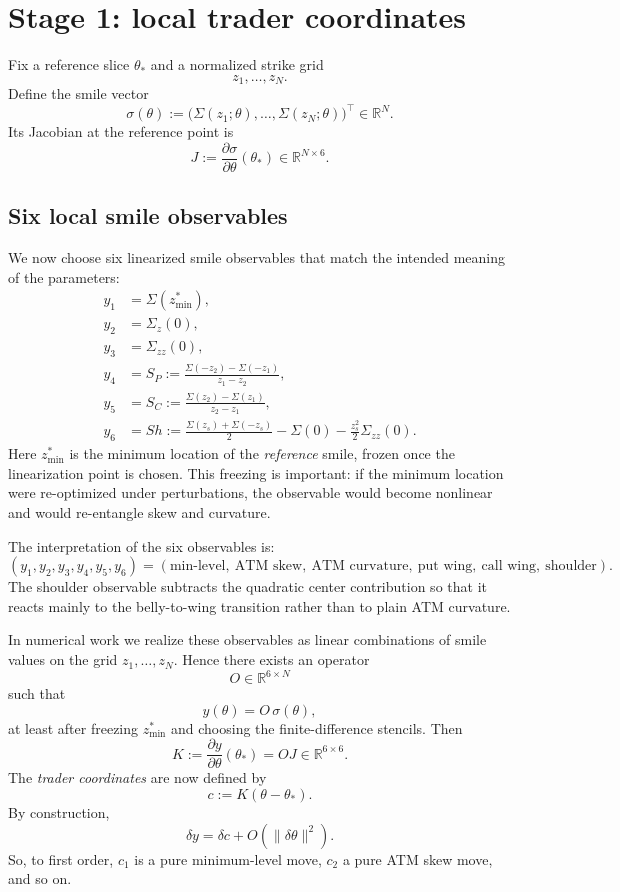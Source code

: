 \documentclass[11pt]{article}
\newcommand{\R}{\mathbb{R}}
\newcommand{\Sig}{\Sigma}
\begin{document}
\section{Stage 1: local trader coordinates}
Fix a reference slice $\theta_*$ and a normalized strike grid
\[
z_1,\dots,z_N.
\]
Define the smile vector
\[
\sigma(\theta)
:= \bigl(\Sig(z_1;\theta),\dots,\Sig(z_N;\theta)\bigr)^\top \in \R^N.
\]
Its Jacobian at the reference point is
\begin{equation}
J := \frac{\partial \sigma}{\partial \theta}(\theta_*) \in \R^{N\times 6}.
\label{eq:J-def}
\end{equation}

\subsection{Six local smile observables}
We now choose six linearized smile observables that match the intended meaning of the parameters:
\begin{align}
y_1 &= \Sig(z_{\min}^*), \\
y_2 &= \Sig_z(0), \\
y_3 &= \Sig_{zz}(0), \\
y_4 &= S_P := \frac{\Sig(-z_2)-\Sig(-z_1)}{z_1-z_2}, \\
y_5 &= S_C := \frac{\Sig(z_2)-\Sig(z_1)}{z_2-z_1}, \\
y_6 &= Sh := \frac{\Sig(z_s)+\Sig(-z_s)}{2} - \Sig(0) - \frac{z_s^2}{2}\Sig_{zz}(0).
\label{eq:observable-defs}
\end{align}
Here $z_{\min}^*$ is the minimum location of the \emph{reference} smile, frozen once the linearization point is chosen. This freezing is important: if the minimum location were re-optimized under perturbations, the observable would become nonlinear and would re-entangle skew and curvature.

The interpretation of the six observables is:
\[
(y_1,y_2,y_3,y_4,y_5,y_6)
=
(\text{min-level},\ \text{ATM skew},\ \text{ATM curvature},\ \text{put wing},\ \text{call wing},\ \text{shoulder}).
\]
The shoulder observable subtracts the quadratic center contribution so that it reacts mainly to the belly-to-wing transition rather than to plain ATM curvature.

In numerical work we realize these observables as linear combinations of smile values on the grid $z_1,\dots,z_N$. Hence there exists an operator
\[
O \in \R^{6\times N}
\]
such that
\[
y(\theta) = O\,\sigma(\theta),
\]
at least after freezing $z_{\min}^*$ and choosing the finite-difference stencils.
Then
\begin{equation}
K := \frac{\partial y}{\partial \theta}(\theta_*) = OJ \in \R^{6\times 6}.
\label{eq:K-def}
\end{equation}
The \emph{trader coordinates} are now defined by
\begin{equation}
c := K(\theta-\theta_*).
\label{eq:trader-coords}
\end{equation}
By construction,
\begin{equation}
\delta y = \delta c + O(\|\delta\theta\|^2).
\label{eq:delta-y-delta-c}
\end{equation}
So, to first order, $c_1$ is a pure minimum-level move, $c_2$ a pure ATM skew move, and so on.
\end{document}
